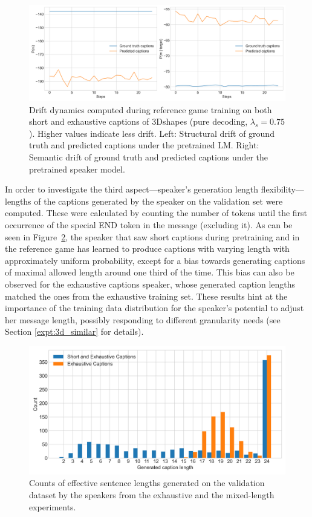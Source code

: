 \begin{figure}[h]
	\centering
	\includegraphics[width=\linewidth]{images/3dshapes_wShort_structural_semantic_drift_49_pure_075_random.png}
	\caption{Drift dynamics computed during reference game training on both short and exhaustive captions of 3Dshapes (pure decoding, $\lambda_s=0.75$). Higher values indicate less drift. Left: Structural drift of ground truth and predicted captions under the pretrained LM. Right: Semantic drift of ground truth and predicted captions under the pretrained speaker model.}
	\label{fig:3dshapes_wShort_075_str_sem_drift}
\end{figure}

In order to investigate the third aspect---speaker's generation length flexibility---lengths of the captions generated by the speaker on the validation set were computed. These were calculated by counting the number of tokens until the first occurrence of the special END token in the message (excluding it). As can be seen in Figure~\ref{fig:3dshapes_exh_short_random_lengths}, the speaker that saw short captions during pretraining and in the reference game has learned to produce captions with varying length with approximately uniform probability, except for a bias towards generating captions of maximal allowed length around one third of the time. This bias can also be observed for the exhaustive captions speaker, whose generated caption lengths matched the ones from the exhaustive training set. These results hint at the importance of the training data distribution for the speaker's potential to adjust her message length, possibly responding to different granularity needs (see Section \ref{expt:3d_similar} for details). 

\begin{figure}[h]
	\centering
	\includegraphics[width=0.7\linewidth]{images/3dshapes_exh_short_random_length_counts.png}
	\caption{Counts of effective sentence lengths generated on the validation dataset by the speakers from the exhaustive and the mixed-length experiments.}
	\label{fig:3dshapes_exh_short_random_lengths}
\end{figure}

